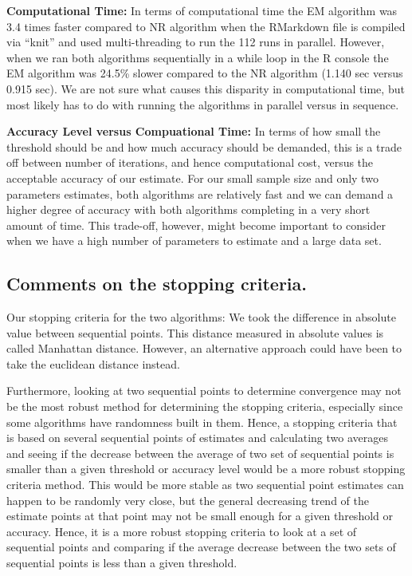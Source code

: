 \documentclass[]{article}
\begin{document}
\textbf{Computational Time:} In terms of computational time the EM
algorithm was 3.4 times faster compared to NR algorithm when the
RMarkdown file is compiled via ``knit'' and used multi-threading to run
the 112 runs in parallel. However, when we ran both algorithms
sequentially in a while loop in the R console the EM algorithm was
24.5\% slower compared to the NR algorithm (1.140 sec versus 0.915 sec).
We are not sure what causes this disparity in computational time, but
most likely has to do with running the algorithms in parallel versus in
sequence.

\textbf{Accuracy Level versus Compuational Time:} In terms of how small
the threshold should be and how much accuracy should be demanded, this
is a trade off between number of iterations, and hence computational
cost, versus the acceptable accuracy of our estimate. For our small
sample size and only two parameters estimates, both algorithms are
relatively fast and we can demand a higher degree of accuracy with both
algorithms completing in a very short amount of time. This trade-off,
however, might become important to consider when we have a high number
of parameters to estimate and a large data set.

\subsection{Comments on the stopping
criteria.}\label{comments-on-the-stopping-criteria.}

Our stopping criteria for the two algorithms: We took the difference in
absolute value between sequential points. This distance measured in
absolute values is called Manhattan distance. However, an alternative
approach could have been to take the euclidean distance instead.

Furthermore, looking at two sequential points to determine convergence
may not be the most robust method for determining the stopping criteria,
especially since some algorithms have randomness built in them. Hence, a
stopping criteria that is based on several sequential points of
estimates and calculating two averages and seeing if the decrease
between the average of two set of sequential points is smaller than a
given threshold or accuracy level would be a more robust stopping
criteria method. This would be more stable as two sequential point
estimates can happen to be randomly very close, but the general
decreasing trend of the estimate points at that point may not be small
enough for a given threshold or accuracy. Hence, it is a more robust
stopping criteria to look at a set of sequential points and comparing if
the average decrease between the two sets of sequential points is less
than a given threshold.
\end{document}
